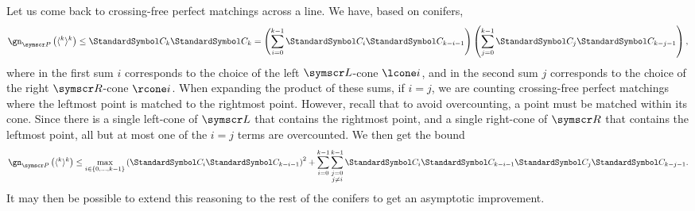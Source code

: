 Let us come back to crossing-free perfect matchings across a line. We have, based on conifers,\[
\gn_{\pointset P}\of{\langle^k\rangle^k}\leq \CatalanNumber k \CatalanNumber k
= \pa{\sum{i=0}[k-1]\CatalanNumber i \CatalanNumber {k-i-1}}
   \pa{\sum{j=0}[k-1]\CatalanNumber j \CatalanNumber {k-j-1}}\text,
\]
where in the first sum $i$ corresponds to the choice of the left $\pointset L$-cone $\lcone i$,
and in the second sum $j$ corresponds to the choice of the right $\pointset R$-cone $\rcone i$.
When expanding the product of these sums, if $i=j$, we are counting crossing-free perfect matchings
where the leftmost point is matched to the rightmost point. However, recall that to avoid overcounting,
a point must be matched within its cone. Since there is a single left-cone of $\pointset L$ that contains the
rightmost point, and a single right-cone of $\pointset R$ that contains the leftmost point, all but at most one
of the $i=j$ terms are overcounted. We then get the bound\[
\gn_{\pointset P}\of{\langle^k\rangle^k}\leq
\max_{i\in\set{0,\dotsc,k-1}} \pa{\CatalanNumber i \CatalanNumber {k-i-1}}^2
+ \sum{i=0}[k-1]\sum{\substack{j=0\\ j\neq i}}[k-1] \CatalanNumber i \CatalanNumber {k-i-1}
                                                   \CatalanNumber j \CatalanNumber {k-j-1}\text.\]
It may then be possible to extend this reasoning to the rest of the conifers to get an asymptotic improvement.